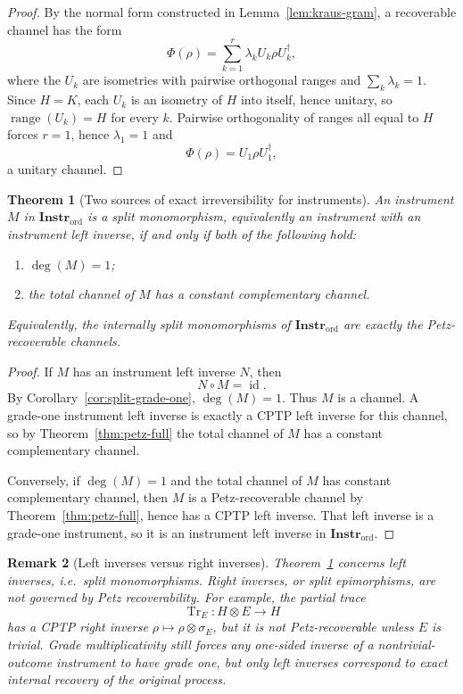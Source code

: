 \documentclass[11pt]{article}
\newtheorem{theorem}{Theorem}[section]
\newtheorem{remark}[theorem]{Remark}
\DeclareMathOperator{\Tr}{Tr}
\DeclareMathOperator{\id}{id}
\DeclareMathOperator{\range}{range}
\begin{document}
\begin{proof}
By the normal form constructed in Lemma~\ref{lem:kraus-gram}, a recoverable
channel has the form
\[
\Phi(\rho)=\sum_{k=1}^r\lambda_k U_k\rho U_k^\dagger,
\]
where the $U_k$ are isometries with pairwise orthogonal ranges and
$\sum_k\lambda_k=1$. Since $H=K$, each $U_k$ is an isometry of $H$ into
itself, hence unitary, so $\range(U_k)=H$ for every $k$. Pairwise
orthogonality of ranges all equal to $H$ forces $r=1$, hence
$\lambda_1=1$ and
\[
\Phi(\rho)=U_1\rho U_1^\dagger,
\]
a unitary channel.
\end{proof}

\begin{theorem}[Two sources of exact irreversibility for instruments]
\label{thm:instrument-two-source}
An instrument $M$ in $\mathbf{Instr}_{\mathrm{ord}}$ is a split
monomorphism, equivalently an instrument with an instrument left inverse,
if and only if both of the following hold:
\begin{enumerate}
\item $\deg(M)=1$;
\item the total channel of $M$ has a constant complementary channel.
\end{enumerate}
Equivalently, the internally split monomorphisms of
$\mathbf{Instr}_{\mathrm{ord}}$ are exactly the Petz-recoverable channels.
\end{theorem}

\begin{proof}
If $M$ has an instrument left inverse $N$, then
\[
N\circ M=\id.
\]
By Corollary~\ref{cor:split-grade-one}, $\deg(M)=1$. Thus $M$ is a channel.
A grade-one instrument left inverse is exactly a CPTP left inverse for this
channel, so by Theorem~\ref{thm:petz-full} the total channel of $M$ has a
constant complementary channel.

Conversely, if $\deg(M)=1$ and the total channel of $M$ has constant
complementary channel, then $M$ is a Petz-recoverable channel by
Theorem~\ref{thm:petz-full}, hence has a CPTP left inverse. That left
inverse is a grade-one instrument, so it is an instrument left inverse in
$\mathbf{Instr}_{\mathrm{ord}}$.
\end{proof}

\begin{remark}[Left inverses versus right inverses]
\label{rem:left-vs-right-inverses}
Theorem~\ref{thm:instrument-two-source} concerns left inverses, i.e.\ split
monomorphisms. Right inverses, or split epimorphisms, are not governed by
Petz recoverability. For example, the partial trace
\[
\Tr_E:H\otimes E\to H
\]
has a CPTP right inverse $\rho\mapsto\rho\otimes\sigma_E$, but it is not
Petz-recoverable unless $E$ is trivial. Grade multiplicativity still forces
any one-sided inverse of a nontrivial-outcome instrument to have grade one,
but only left inverses correspond to exact internal recovery of the original
process.
\end{remark}
\end{document}
